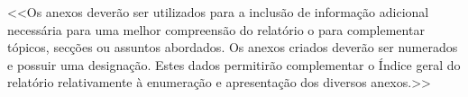 \documentclass[a4paper,12pt]{scrreprt}
\begin{document}




    <<Os anexos deverão ser utilizados para a inclusão de informação adicional necessária para uma melhor compreensão do relatório o para complementar tópicos, secções ou assuntos abordados. Os anexos criados deverão ser numerados e possuir uma designação. Estes dados permitirão complementar o Índice geral do relatório relativamente à enumeração e apresentação dos diversos anexos.>>
    


\end{document}
